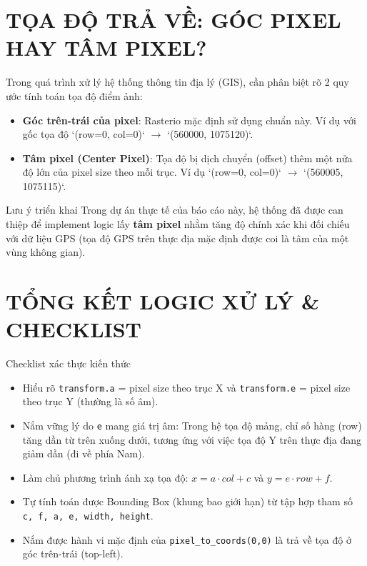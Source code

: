 \documentclass[12pt,a4paper]{report}
\begin{document}
\section{TỌA ĐỘ TRẢ VỀ: GÓC PIXEL HAY TÂM PIXEL?}

Trong quá trình xử lý hệ thống thông tin địa lý (GIS), cần phân biệt rõ 2 quy ước tính toán tọa độ điểm ảnh:
\begin{itemize}
    \item \textbf{Góc trên-trái của pixel}: Rasterio mặc định sử dụng chuẩn này. Ví dụ với gốc tọa độ `(row=0, col=0)` $\rightarrow$ `(560000, 1075120)`.
    \item \textbf{Tâm pixel (Center Pixel)}: Tọa độ bị dịch chuyển (offset) thêm một nửa độ lớn của pixel size theo mỗi trục. Ví dụ `(row=0, col=0)` $\rightarrow$ `(560005, 1075115)`.
\end{itemize}

\begin{insightbox}{Lưu ý triển khai}
Trong dự án thực tế của báo cáo này, hệ thống đã được can thiệp để implement logic lấy \textbf{tâm pixel} nhằm tăng độ chính xác khi đối chiếu với dữ liệu GPS (tọa độ GPS trên thực địa mặc định được coi là tâm của một vùng không gian).
\end{insightbox}

\section{TỔNG KẾT LOGIC XỬ LÝ \& CHECKLIST}

\begin{resultbox}{Checklist xác thực kiến thức}
\begin{itemize}
    \item[\checkmark] Hiểu rõ \texttt{transform.a} = pixel size theo trục X và \texttt{transform.e} = pixel size theo trục Y (thường là số âm).
    \item[\checkmark] Nắm vững lý do \texttt{e} mang giá trị âm: Trong hệ tọa độ mảng, chỉ số hàng (row) tăng dần từ trên xuống dưới, tương ứng với việc tọa độ Y trên thực địa đang giảm dần (đi về phía Nam).
    \item[\checkmark] Làm chủ phương trình ánh xạ tọa độ: $x = a \cdot col + c$ và $y = e \cdot row + f$.
    \item[\checkmark] Tự tính toán được Bounding Box (khung bao giới hạn) từ tập hợp tham số \texttt{c, f, a, e, width, height}.
    \item[\checkmark] Nắm được hành vi mặc định của \texttt{pixel\_to\_coords(0,0)} là trả về tọa độ ở góc trên-trái (top-left).
\end{itemize}
\end{resultbox}
\end{document}
